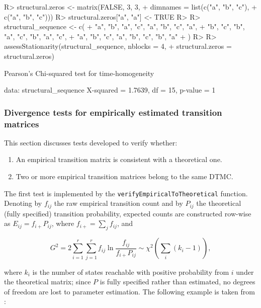 \documentclass[
  nojss]{jss}
\providecommand{\tightlist}{%
  \setlength{\itemsep}{0pt}\setlength{\parskip}{0pt}}
\begin{document}
\begin{CodeChunk}
\begin{CodeInput}
R> structural.zeros <- matrix(FALSE, 3, 3,
+                            dimnames = list(c("a", "b", "c"),
+                                            c("a", "b", "c")))
R> structural.zeros["a", "a"] <- TRUE
R> 
R> structural_sequence <- c(
+   "a", "b", "a", "c", "a", "b", "c", "a",
+   "b", "c", "b", "a", "c", "b", "a", "c",
+   "a", "b", "c", "a", "b", "c", "b", "a"
+ )
R> 
R> assessStationarity(structural_sequence, nblocks = 4,
+                    structural.zeros = structural.zeros)
\end{CodeInput}
\begin{CodeOutput}

    Pearson's Chi-squared test for time-homogeneity

data:  structural_sequence
X-squared = 1.7639, df = 15, p-value = 1
\end{CodeOutput}
\end{CodeChunk}

\subsubsection{Divergence tests for empirically estimated transition matrices}\label{divergence-tests-for-empirically-estimated-transition-matrices}

This section discusses tests developed to verify whether:

\begin{enumerate}
\def\labelenumi{\arabic{enumi}.}
\tightlist
\item
  An empirical transition matrix is consistent with a theoretical one.\\
\item
  Two or more empirical transition matrices belong to the same DTMC.
\end{enumerate}

The first test is implemented by the \texttt{verifyEmpiricalToTheoretical} function. Denoting by \(f_{ij}\) the raw empirical transition count and by \(P_{ij}\) the theoretical (fully specified) transition probability, expected counts are constructed row-wise as \(E_{ij}=f_{i+}P_{ij}\), where \(f_{i+}=\sum_j f_{ij}\), and

\[
G^2 = 2\sum_{i=1}^{r}\sum_{j=1}^{r}f_{ij}\ln\frac{f_{ij}}{f_{i+}P_{ij}} \sim \chi^2\left ( \textstyle\sum_i (k_i - 1) \right ),
\]

where \(k_i\) is the number of states reachable with positive probability from \(i\) under the theoretical matrix; since \(P\) is fully specified rather than estimated, no degrees of freedom are lost to parameter estimation. The following example is taken from \cite{kullback1962tests}:
\end{document}
